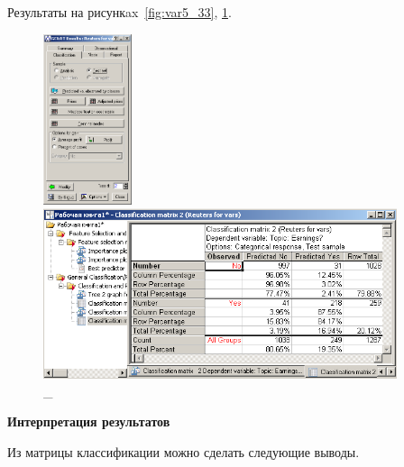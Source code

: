 Результаты на рисункax~\ref{fig:var5_33}, \ref{fig:var5_34}.

\begin{figure}[!h]
  \centering

  \begin{minipage}{0.29\textwidth}
    \centering

    \includegraphics[height=5cm]
    {inc/var5/33.PNG}

    \caption{\_}

    \label{fig:var5_33}
  \end{minipage}
  \begin{minipage}{0.69\textwidth}
    \centering

    \includegraphics[height=5cm]
    {inc/var5/34.PNG}

    \caption{\_}

    \label{fig:var5_34}
  \end{minipage}
\end{figure}

\newpage

\begin{center}
  \textbf{Интерпретация результатов}
\end{center}

Из матрицы классификации можно сделать следующие выводы.

